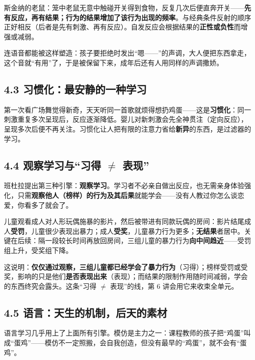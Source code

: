 \documentclass[UTF8,a4paper,11pt]{ctexart}
\begin{document}
\begin{keyconcept}[操作条件反射]
斯金纳的老鼠：笼中老鼠无意中触碰开关得到食物，反复几次后便直奔开关——\textbf{先有反应，再有结果；行为的结果增加了该行为出现的频率}。与经典条件反射的顺序正好相反（后者是先有刺激、再有反应）。自发反应会根据结果的\textbf{正性或负性}而增强或减弱。
\end{keyconcept}

连语音都能被这样塑造：孩子要拒绝时发出“嗯——”的声调，大人便把东西拿走，这个音就“有用”了，于是被保留下来，成年后还有人用同样的声调撒娇。

\subsection*{4.3 习惯化：最安静的一种学习}

第一次看广场舞觉得新奇，天天听同一首歌就烦得想扔鸡蛋——这是\textbf{习惯化}：同一刺激重复多次呈现后，反应逐渐降低。婴儿对新刺激会先全神贯注（定向反应），呈现多次后便不再关注。习惯化让人把有限的注意力省给\textbf{新异}的东西，是过滤器的学习。

\subsection*{4.4 观察学习与“习得 $\neq$ 表现”}

班杜拉提出第三种引擎：\textbf{观察学习}。学习者不必亲自做出反应，也无需亲身体验强化，只需\textbf{观察他人（榜样）的行为及其后果}就能学会——没有人教过你怎么谈恋爱，你看多了就会了。

\begin{keyconcept}
儿童观看成人对人形玩偶施暴的影片，然后被带进有同款玩偶的房间：影片结尾成人\textbf{受罚}，儿童很少表现出暴力；成人\textbf{受奖}，儿童暴力行为更多；\textbf{无结果}者居中。关键在后续：隔一段较长时间再放回房间，三组儿童的暴力行为\textbf{向中间趋近}——受罚组上升，受奖组下降。
\end{keyconcept}

这说明：\textbf{仅仅通过观察，三组儿童都已经学会了暴力行为}（习得）；榜样受罚或受奖，影响的只是他们\textbf{是否表现出来}（表现）；而结果的限制作用随时间减弱，学会的东西终究会露头。这条“习得 $\neq$ 表现”的线，第 6 讲会用它来收束全单元。

\subsection*{4.5 语言：天生的机制，后天的素材}

语言学习几乎用上了上面所有引擎。模仿是主力之一：课程教师的孩子把“鸡蛋”叫成“蛋鸡”——模仿不一定照搬，会自我创造，但没有最早的“鸡蛋”，就不会有“蛋鸡”。
\end{document}
